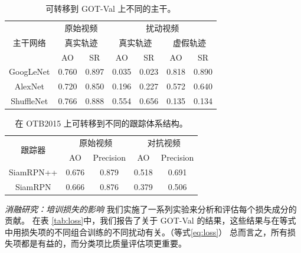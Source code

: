 \begin{table}[t]
\centering
\begin{tabular}{c cc cc cc} 
\toprule
\multirow{3}{*}[-6pt]{主干网络} & \multicolumn{2}{c}{原始视频}    & \multicolumn{4}{c}{扰动视频}                                        \\ 
\cmidrule(lr){2-3} \cmidrule(lr){4-7}
                          & \multicolumn{2}{c}{真实轨迹} & \multicolumn{2}{c}{真实轨迹} & \multicolumn{2}{c}{虚假轨迹}  \\ 
\cmidrule(lr){2-3} \cmidrule(lr){4-7}
                          & AO    & SR                           & AO    & SR                           & AO    & SR                           \\ 
\midrule
GoogLeNet                 & 0.760 & 0.897                        & 0.035 & 0.023                        & 0.818 & 0.890                        \\
AlexNet                   & 0.720 & 0.850                        & 0.196 & 0.227                        & 0.572 & 0.640                        \\
ShuffleNet                & 0.766 & 0.888                        & 0.554 & 0.656                        & 0.135 & 0.134                        \\
\bottomrule
\end{tabular}
\caption{可转移到 GOT-Val 上不同的主干。}
\label{tab:backbone}
\end{table}

\begin{table}
\centering
\begin{tabular}{ccccc} 
\toprule
\multirow{2}{*}[-2pt]{跟踪器} & \multicolumn{2}{c}{原始视频} & \multicolumn{2}{c}{对抗视频}  \\
\cmidrule(lr){2-3} \cmidrule(lr){4-5}
                          & AO & Precision              & AO & Precision                   \\
\midrule
SiamRPN++                 & 0.676   & 0.879                  & 0.518   & 0.691                       \\
SiamRPN                   & 0.666   & 0.876                  & 0.379   & 0.506                       \\
\bottomrule
\end{tabular}
\caption{在 OTB2015 上可转移到不同的跟踪体系结构。}
\label{tab:arch}
\end{table}

\textit{消融研究：培训损失的影响} 我们实施了一系列实验来分析和评估每个损失成分的贡献。
在表 \ref{tab:loss}中，我们报告了关于 GOT-Val 的结果，这些结果与在等式中用损失项的不同组合训练的不同扰动有关。（等式\ref{eq:loss}）
总而言之，所有损失项都是有益的，而分类项比质量评估项更重要。

